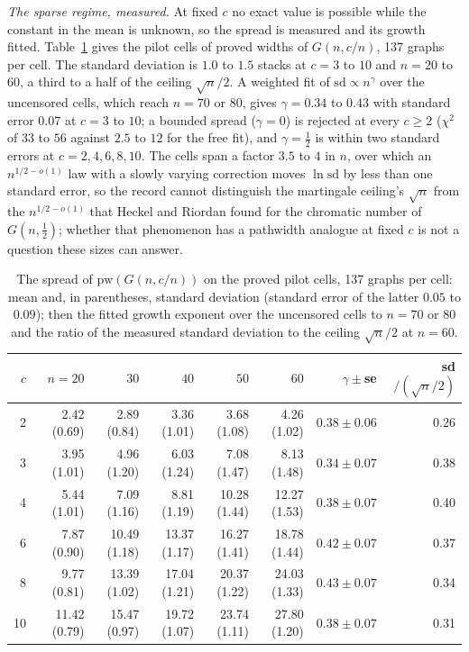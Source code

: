 \emph{The sparse regime, measured.} At fixed $c$ no exact value is
possible while the constant in the mean is unknown, so the spread is
measured and its growth fitted. Table~\ref{tab:concsparse} gives the pilot
cells of proved widths of $G(n,c/n)$, 137 graphs per cell. The standard
deviation is $1.0$ to $1.5$ stacks at $c=3$ to $10$ and $n=20$ to $60$, a
third to a half of the ceiling $\sqrt n/2$. A weighted fit of
$\mathrm{sd}\propto n^{\gamma}$ over the uncensored cells, which reach
$n=70$ or $80$, gives $\gamma=0.34$ to $0.43$ with standard error $0.07$ at
$c=3$ to $10$; a bounded spread ($\gamma=0$) is rejected at every
$c\ge2$ ($\chi^{2}$ of $33$ to $56$ against $2.5$ to $12$ for the free fit),
and $\gamma=\tfrac12$ is within two standard errors at $c=2,4,6,8,10$. The
cells span a factor $3.5$ to $4$ in $n$, over which an $n^{1/2-o(1)}$ law
with a slowly varying correction moves $\ln\mathrm{sd}$ by less than one
standard error, so the record cannot distinguish the martingale ceiling's
$\sqrt n$ from the $n^{1/2-o(1)}$ that Heckel and Riordan found for the
chromatic number of $G(n,\tfrac12)$; whether that phenomenon has a pathwidth
analogue at fixed $c$ is not a question these sizes can answer.

\begin{table}[htbp]
\centering
\caption{The spread of $\mathrm{pw}(G(n,c/n))$ on the proved pilot cells,
137 graphs per cell: mean and, in parentheses, standard deviation (standard
error of the latter $0.05$ to $0.09$); then the fitted growth exponent over
the uncensored cells to $n=70$ or $80$ and the ratio of the measured
standard deviation to the ceiling $\sqrt n/2$ at $n=60$.}
\label{tab:concsparse}
\begin{tabular}{@{}rrrrrrrr@{}}
\toprule
$c$ & $n=20$ & $30$ & $40$ & $50$ & $60$ & $\gamma\pm$se & sd$/(\sqrt n/2)$ \\
\midrule
2  & 2.42 (0.69) & 2.89 (0.84) & 3.36 (1.01) & 3.68 (1.08) & 4.26 (1.02) & $0.38\pm0.06$ & 0.26 \\
3  & 3.95 (1.01) & 4.96 (1.20) & 6.03 (1.24) & 7.08 (1.47) & 8.13 (1.48) & $0.34\pm0.07$ & 0.38 \\
4  & 5.44 (1.01) & 7.09 (1.16) & 8.81 (1.19) & 10.28 (1.44) & 12.27 (1.53) & $0.38\pm0.07$ & 0.40 \\
6  & 7.87 (0.90) & 10.49 (1.18) & 13.37 (1.17) & 16.27 (1.41) & 18.78 (1.44) & $0.42\pm0.07$ & 0.37 \\
8  & 9.77 (0.81) & 13.39 (1.02) & 17.04 (1.21) & 20.37 (1.22) & 24.03 (1.33) & $0.43\pm0.07$ & 0.34 \\
10 & 11.42 (0.79) & 15.47 (0.97) & 19.72 (1.07) & 23.74 (1.11) & 27.80 (1.20) & $0.38\pm0.07$ & 0.31 \\
\bottomrule
\end{tabular}
\end{table}

